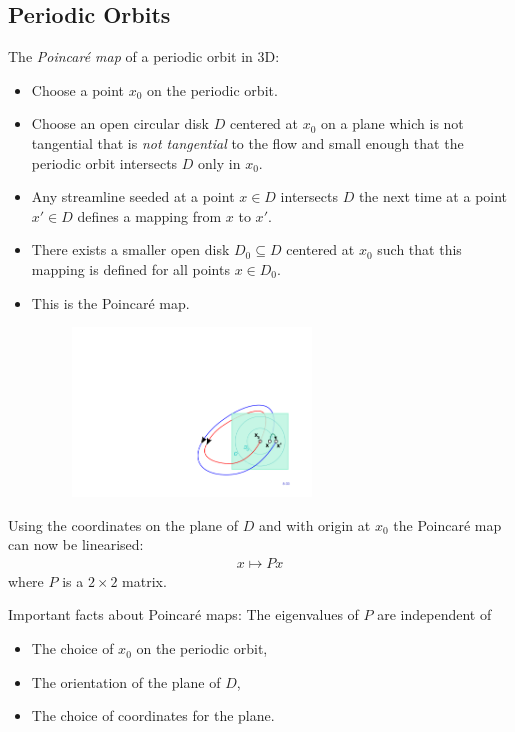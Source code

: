 \subsection{Periodic Orbits}
The \emph{Poincaré map} of a periodic orbit in 3D:
\begin{itemize}
    \item Choose a point $x_0$ on the periodic orbit.
    \item Choose an open circular disk $D$ centered at $x_0$ on a plane which is not tangential that is \emph{not tangential} to the flow and small enough that the periodic orbit intersects $D$ only in $x_0$.
    \item Any streamline seeded at a point $x\in D$ intersects $D$ the next time at a point $x' \in D$ defines a mapping from $x$ to $x'$.
    \item There exists a smaller open disk $D_0\subseteq D$ centered at $x_0$ such that this mapping is defined for all points $x\in D_0$.
    \item This is the Poincaré map.
        \begin{figure}[H]
            \centering
            \includegraphics[width=0.6\textwidth]{img/08_poincare_map}
        \end{figure}
        
\end{itemize}

Using the coordinates on the plane of $D$ and with origin at $x_0$ the Poincaré map can now be linearised:
    \begin{align*}
        x\mapsto Px
    \end{align*}
where $P$ is a $2\times 2$ matrix.

Important facts about Poincaré maps: The eigenvalues of $P$ are independent of
\begin{itemize}
    \item The choice of $x_0$ on the periodic orbit,
    \item The orientation of the plane of $D$,
    \item The choice of coordinates for the plane.
\end{itemize}

